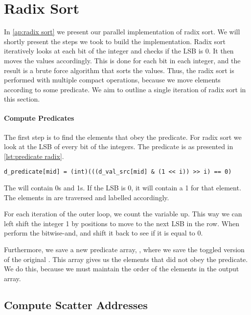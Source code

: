\section{Radix Sort}
\label{sec:radix sort}

In \cref{ap:radix sort} we present our parallel implementation of radix sort.
We will shortly present the steps we took to build the implementation.
Radix sort iteratively looks at each bit of the integer and checks if the LSB is 0.
It then moves the values accordingly.
This is done for each bit in each integer, and the result is a brute force algorithm that sorts the values.
Thus, the radix sort is performed with multiple compact operations, because we move elements according to some predicate.
We aim to outline a single iteration of radix sort in this section.


\paragraph{Compute Predicates}
The first step is to find the elements that obey the predicate.
For radix sort we look at the LSB of every bit of the integers.
The predicate is as presented in \cref{lst:predicate radix}.

\begin{lstlisting}[caption={predicate to calculate}, label={lst:predicate radix}]
d_predicate[mid] = (int)(((d_val_src[mid] & (1 << i)) >> i) == 0)
\end{lstlisting}

The  will contain 0s and 1s.
If the LSB is 0, it will contain a 1 for that element.
The elements in  are traversed and labelled accordingly.

For each iteration of the outer loop, we count the  variable up.
This way we can left shift the integer 1 by  positions to move to the next LSB in the row.
When perform the bitwise-and, and shift it back to see if it is equal to 0.

Furthermore, we save a new predicate array, , where we save the toggled version of the original .
This array gives us the elements that did not obey the predicate.
We do this, because we must maintain the order of the elements in the output array.

\subsection*{Compute Scatter Addresses}

